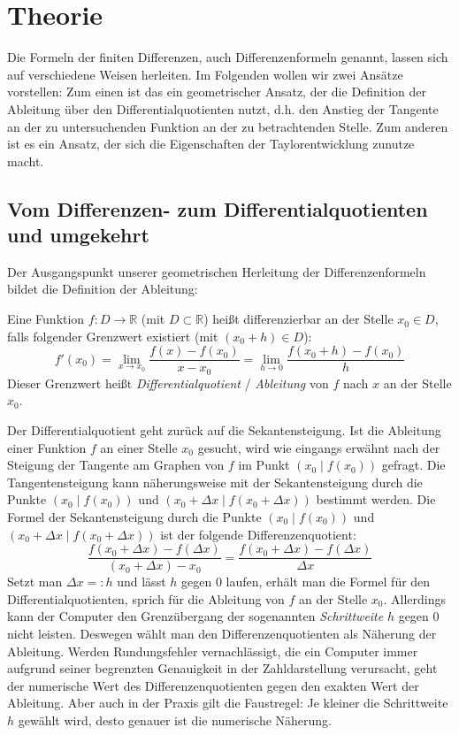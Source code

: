 \documentclass{scrartcl}
\begin{document}
\pagebreak \section{Theorie}
\label{sec:theorie}
Die Formeln der finiten Differenzen, auch Differenzenformeln genannt, lassen sich auf verschiedene Weisen herleiten. Im Folgenden wollen wir zwei Ansätze vorstellen: Zum einen ist das ein geometrischer Ansatz, der die Definition der Ableitung über den Differentialquotienten nutzt, d.h. den Anstieg der Tangente an der zu untersuchenden Funktion an der zu betrachtenden Stelle. Zum anderen ist es ein Ansatz, der sich die Eigenschaften der Taylorentwicklung zunutze macht.

\subsection{Vom Differenzen- zum Differentialquotienten und umgekehrt}
\label{ssec:herleitung1}
Der Ausgangspunkt unserer geometrischen Herleitung der Differenzenformeln bildet die Definition der Ableitung:
\begin{shaded}
  Eine Funktion $f:D \rightarrow \mathbb{R}$ (mit $D\subset \mathbb{R}$) heißt differenzierbar an der Stelle $x_0 \in D$, falls folgender Grenzwert existiert (mit $(x_0+h) \in D$): \[f'(x_0) = \lim _{x\to x_0} {\frac {f(x)-f(x_0)}{x-x_0}} = \lim _{h\to 0} {\frac {f(x_0+h)-f(x_0)}{h}}\] Dieser Grenzwert heißt \textit{Differentialquotient} / \textit{Ableitung} von $f$ nach $x$ an der Stelle $x_0$.
\end{shaded}
Der Differentialquotient geht zurück auf die Sekantensteigung. Ist die Ableitung einer Funktion $f$ an einer Stelle $x_0$ gesucht, wird wie eingangs erwähnt nach der Steigung der Tangente am Graphen von $f$ im Punkt $(x_0 \mid f(x_0))$ gefragt. Die Tangentensteigung kann näherungsweise mit der Sekantensteigung durch die Punkte $(x_0 \mid f(x_0))$ und $(x_0 + \Delta x \mid f(x_0 + \Delta x))$ bestimmt werden. Die Formel der Sekantensteigung durch die Punkte $(x_0 \mid f(x_0))$ und $(x_0 + \Delta x \mid f(x_0 + \Delta x))$ ist der folgende Differenzenquotient: \[\frac {f(x_0 + \Delta x)-f(\Delta x)}{(x_0 + \Delta x) - x_0} = \frac {f(x_0 + \Delta x)-f(\Delta x)}{\Delta x}\]
Setzt man $\Delta x =: h$ und lässt $h$ gegen $0$ laufen, erhält man die Formel für den Differentialquotienten, sprich für die Ableitung von $f$ an der Stelle $x_0$. Allerdings kann der Computer den Grenzübergang der sogenannten \textit{Schrittweite} $h$ gegen $0$ nicht leisten. Deswegen wählt man den Differenzenquotienten als Näherung der Ableitung. Werden Rundungsfehler vernachlässigt, die ein Computer immer aufgrund seiner begrenzten Genauigkeit in der Zahldarstellung verursacht, geht der numerische Wert des Differenzenquotienten gegen den exakten Wert der Ableitung. Aber auch in der Praxis gilt die Faustregel: Je kleiner die Schrittweite $h$ gewählt wird, desto genauer ist die numerische Näherung. \\
\end{document}

